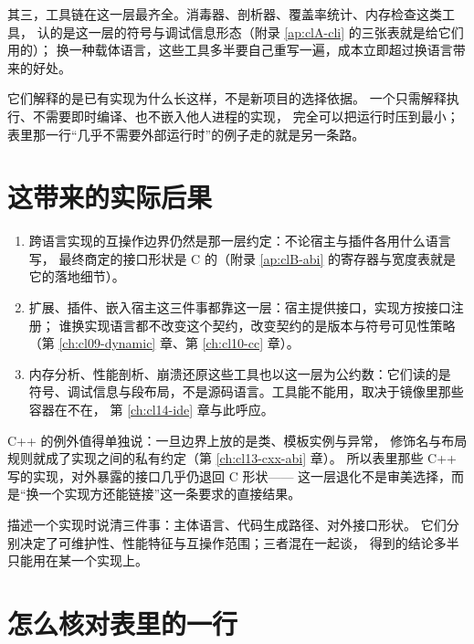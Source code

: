 \documentclass[12pt,a4paper,fontset=fandol]{ctexbook}
\newcommand{\Lang}[1]{\textsf{#1}}
\newcommand{\CL}{\Lang{C}}
\newcommand{\CPP}{\Lang{C++}}
\begin{document}
其三，工具链在这一层最齐全。消毒器、剖析器、覆盖率统计、内存检查这类工具，
认的是这一层的符号与调试信息形态（附录 \ref{ap:clA-cli} 的三张表就是给它们用的）；
换一种载体语言，这些工具多半要自己重写一遍，成本立即超过换语言带来的好处。

\begin{warning}[title=别把这三条读成“应该用 \CL{} 重写”]
它们解释的是已有实现为什么长这样，不是新项目的选择依据。
一个只需解释执行、不需要即时编译、也不嵌入他人进程的实现，
完全可以把运行时压到最小；表里那一行“几乎不需要外部运行时”的例子走的就是另一条路。
\end{warning}

\section{这带来的实际后果}

\begin{guideline}[title=三条后果]
\begin{enumerate}
\item 跨语言实现的互操作边界仍然是那一层约定：不论宿主与插件各用什么语言写，
最终商定的接口形状是 C 的（附录 \ref{ap:clB-abi} 的寄存器与宽度表就是它的落地细节）。
\item 扩展、插件、嵌入宿主这三件事都靠这一层：宿主提供接口，实现方按接口注册；
谁换实现语言都不改变这个契约，改变契约的是版本与符号可见性策略
（第 \ref{ch:cl09-dynamic} 章、第 \ref{ch:cl10-cc} 章）。
\item 内存分析、性能剖析、崩溃还原这些工具也以这一层为公约数：它们读的是
符号、调试信息与段布局，不是源码语言。工具能不能用，取决于镜像里那些容器在不在，
第 \ref{ch:cl14-ide} 章与此呼应。
\end{enumerate}
\end{guideline}

\CPP{} 的例外值得单独说：一旦边界上放的是类、模板实例与异常，
修饰名与布局规则就成了实现之间的私有约定（第 \ref{ch:cl13-cxx-abi} 章）。
所以表里那些 \CPP{} 写的实现，对外暴露的接口几乎仍退回 \CL{} 形状——
这一层退化不是审美选择，而是“换一个实现方还能链接”这一条要求的直接结果。

\begin{bestpractice}[title=把这三层分别写清楚]
描述一个实现时说清三件事：主体语言、代码生成路径、对外接口形状。
它们分别决定了可维护性、性能特征与互操作范围；三者混在一起谈，
得到的结论多半只能用在某一个实现上。
\end{bestpractice}

\section{怎么核对表里的一行}
\end{document}
